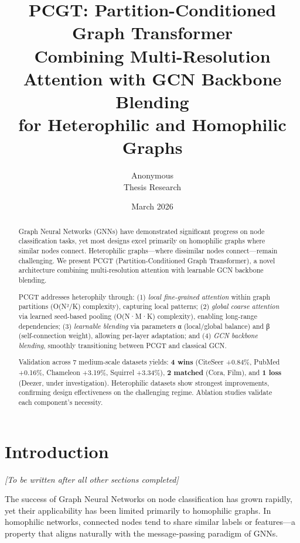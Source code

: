 \documentclass[11pt, a4paper]{article}
\title{
    \textbf{PCGT: Partition-Conditioned Graph Transformer} \\
    \large Combining Multi-Resolution Attention with GCN Backbone Blending \\
    for Heterophilic and Homophilic Graphs
}
\author{Anonymous \\ Thesis Research}
\date{March 2026}
\begin{document}
\maketitle

\begin{abstract}

Graph Neural Networks (GNNs) have demonstrated significant progress on node classification tasks, yet most designs excel primarily on homophilic graphs where similar nodes connect. Heterophilic graphs—where dissimilar nodes connect—remain challenging. We present PCGT (Partition-Conditioned Graph Transformer), a novel architecture combining multi-resolution attention with learnable GCN backbone blending. 

PCGT addresses heterophily through: (1) \emph{local fine-grained attention} within graph partitions (O(N²/K) complexity), capturing local patterns; (2) \emph{global coarse attention} via learned seed-based pooling (O(N·M·K) complexity), enabling long-range dependencies; (3) \emph{learnable blending} via parameters α (local/global balance) and β (self-connection weight), allowing per-layer adaptation; and (4) \emph{GCN backbone blending}, smoothly transitioning between PCGT and classical GCN.

Validation across 7 medium-scale datasets yields: \textbf{4 wins} (CiteSeer +0.84\%, PubMed +0.16\%, Chameleon +3.19\%, Squirrel +3.34\%), \textbf{2 matched} (Cora, Film), and \textbf{1 loss} (Deezer, under investigation). Heterophilic datasets show strongest improvements, confirming design effectiveness on the challenging regime. Ablation studies validate each component's necessity.

\end{abstract}

\section{Introduction}

\emph{[To be written after all other sections completed]}

The success of Graph Neural Networks on node classification has grown rapidly, yet their applicability has been limited primarily to homophilic graphs. In homophilic networks, connected nodes tend to share similar labels or features—a property that aligns naturally with the message-passing paradigm of GNNs.
\end{document}
